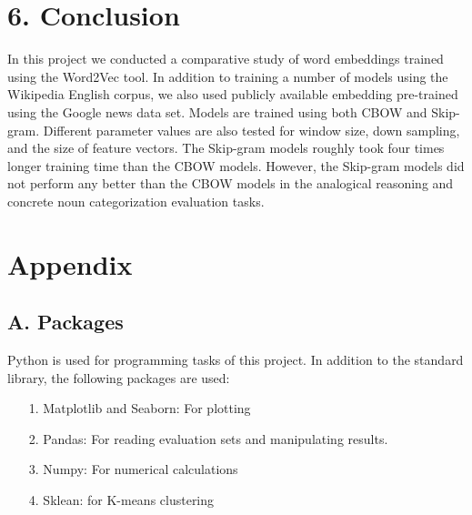 \documentclass[12pt]{report}
\begin{document}
\section*{6. Conclusion}
In this project we conducted a comparative study of word embeddings trained using the Word2Vec
tool. In addition to training a number of models using the Wikipedia English corpus, we also  used publicly available embedding pre-trained using the Google news data set. Models are trained using both CBOW and Skip-gram. Different parameter values are also tested for window size, down sampling, and the size of feature vectors. The Skip-gram models roughly took four times longer training time than the CBOW models. However, the Skip-gram models did not perform any better than the CBOW models in the analogical reasoning and concrete noun categorization evaluation tasks.
\newpage




\newpage
\section*{Appendix}
\subsection*{A. Packages}
Python is used for programming tasks of this project. In addition to the standard library, the
following packages are used:

\begin{itemize}
	\item[1.] Matplotlib and Seaborn: For plotting
	\item[2.] Pandas: For reading evaluation sets and manipulating results.
	\item[3.] Numpy: For numerical calculations
	\item[4.] Sklean: for K-means clustering
\end{itemize}
\end{document}
